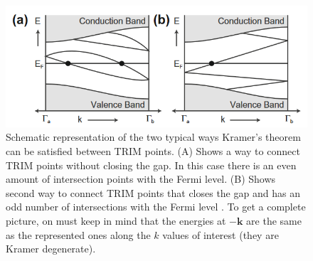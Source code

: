 \\[0.3cm]

\begin{figure}[t]
    \includegraphics[scale = 0.8]{sections/visuel/kramer.png}
    \caption{Schematic representation of the two typical ways Kramer's theorem can be satisfied between TRIM points. (A) Shows a way to connect TRIM points without closing the gap. In this case there is an even amount of intersection points with the Fermi level. (B) Shows second way to connect TRIM points that closes the gap and has an odd number of intersections with the Fermi level \cite{kane_topological_2013}. To get a complete picture, on must keep in mind that the energies at $-\mathbf{k}$ are the same as the represented ones along the $k$ values of interest (they are Kramer degenerate).}
    \label{TRIM}
\end{figure}

